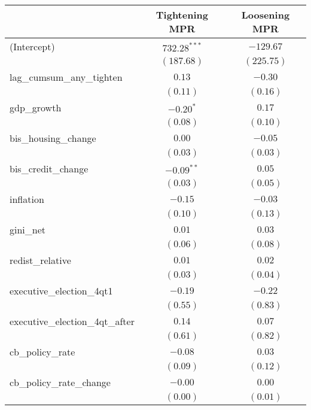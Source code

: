 
\begin{tabular}{l c c }
\hline
 & Tightening MPR & Loosening MPR \\
\hline
(Intercept)                     & $732.28^{***}$ & $-129.67$  \\
                                & $(187.68)$     & $(225.75)$ \\
lag\_cumsum\_any\_tighten       & $0.13$         & $-0.30$    \\
                                & $(0.11)$       & $(0.16)$   \\
gdp\_growth                     & $-0.20^{*}$    & $0.17$     \\
                                & $(0.08)$       & $(0.10)$   \\
bis\_housing\_change            & $0.00$         & $-0.05$    \\
                                & $(0.03)$       & $(0.03)$   \\
bis\_credit\_change             & $-0.09^{**}$   & $0.05$     \\
                                & $(0.03)$       & $(0.05)$   \\
inflation                       & $-0.15$        & $-0.03$    \\
                                & $(0.10)$       & $(0.13)$   \\
gini\_net                       & $0.01$         & $0.03$     \\
                                & $(0.06)$       & $(0.08)$   \\
redist\_relative                & $0.01$         & $0.02$     \\
                                & $(0.03)$       & $(0.04)$   \\
executive\_election\_4qt1       & $-0.19$        & $-0.22$    \\
                                & $(0.55)$       & $(0.83)$   \\
executive\_election\_4qt\_after & $0.14$         & $0.07$     \\
                                & $(0.61)$       & $(0.82)$   \\
cb\_policy\_rate                & $-0.08$        & $0.03$     \\
                                & $(0.09)$       & $(0.12)$   \\
cb\_policy\_rate\_change        & $-0.00$        & $0.00$     \\
                                & $(0.00)$       & $(0.01)$   \\

\end{tabular}
